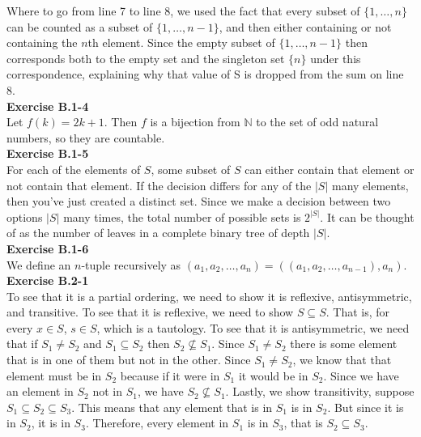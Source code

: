 \documentclass{article}
\begin{document}
Where to go from line 7 to line 8, we used the fact that every subset of $\{1,\ldots,n\}$ can be counted as a subset of $\{1,\ldots, n-1\}$, and then either containing or not containing the $n$th element. Since the empty subset of $\{1,\ldots,n-1\}$ then corresponds both to the empty set and the singleton set $\{n\}$ under this correspondence, explaining why that value of S is dropped from the sum on line 8.\\

\noindent\textbf{Exercise B.1-4}\\

Let $f(k) = 2k+1$.  Then $f$ is a bijection from $\mathbb{N}$ to the set of odd natural numbers, so they are countable. \\


\noindent\textbf{Exercise B.1-5}\\
For each of the elements of $S$, some subset of $S$ can either contain that element or not contain that element. If the decision differs for any of the $|S|$ many elements, then you've just created a distinct set. Since we make a decision between two options $|S|$ many times, the total number of possible sets is $2^{|S|}$. It can be thought of as the number of leaves in a complete binary tree of depth $|S|$.\\

\noindent\textbf{Exercise B.1-6}\\

We define an $n$-tuple recursively as $(a_1, a_2, \ldots, a_n) = ((a_1, a_2, \ldots, a_{n-1}), a_n)$.\\


\noindent\textbf{Exercise B.2-1}\\
To see that it is a partial ordering, we need to show it is reflexive, antisymmetric, and transitive. To see that it is reflexive, we need to show $S\subseteq S$. That is, for every $x\in S$, $s\in S$, which is a tautology. To see that it is antisymmetric, we need that if $S_1 \neq S_2$ and $S_1 \subseteq S_2$ then $S_2 \not \subseteq S_1$. Since $S_1\neq S_2$ there is some element that is in one of them but not in the other. Since $S_1 \neq S_2$, we know that that element must be in $S_2$ because if it were in $S_1$ it would be in $S_2$. Since we have an element in $S_2$ not in $S_1$, we have $S_2 \not\subseteq S_1$. Lastly, we show transitivity, suppose $S_1 \subseteq S_2 \subseteq S_3$. This means that any element that is in $S_1$ is in $S_2$. But since it is in $S_2$, it is in $S_3$. Therefore, every element in $S_1$ is in $S_3$, that is $S_2 \subseteq S_3$.
\end{document}
